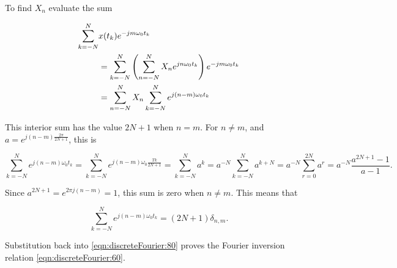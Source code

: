 To find \( X_n \) evaluate the sum

\begin{equation}\label{eqn:discreteFourier:80}
\begin{aligned}
\sum_{k = -N}^N &x(t_k) e^{-j m \omega_0 t_k} \\
&=
\sum_{k = -N}^N 
\lr{
\sum_{n = -N}^N X_n e^{ j n \omega_0 t_k}
}
e^{-j m \omega_0 t_k} \\
&=
\sum_{n = -N}^N X_n 
\sum_{k = -N}^N 
e^{ j (n -m )\omega_0 t_k}
\end{aligned}
\end{equation}

This interior sum has the value \( 2 N + 1 \) when \( n = m \).  For \( n \ne m \), and 
\( a = e^{j (n -m ) \frac{2 \pi}{2 N + 1}} \), this is

\begin{dmath}\label{eqn:discreteFourier:100}
\sum_{k = -N}^N 
e^{ j (n -m )\omega_0 t_k}
=
\sum_{k = -N}^N 
e^{ j (n -m )\omega_0 \frac{T k}{2 N + 1}}
=
\sum_{k = -N}^N a^k
=
a^{-N} \sum_{k = -N}^N a^{k+ N}
=
a^{-N} \sum_{r = 0}^{2 N} a^{r}
=
a^{-N} \frac{a^{2 N + 1} - 1}{a - 1}.
\end{dmath}

Since \( a^{2 N + 1} = e^{2 \pi j (n - m)} = 1 \), this sum is zero when \( n \ne m \).  This means that

\begin{equation}\label{eqn:discreteFourier:120}
\sum_{k = -N}^N 
e^{ j (n -m )\omega_0 t_k} = (2 N + 1) \delta_{n,m}.
\end{equation}

Substitution back into \cref{eqn:discreteFourier:80} proves the Fourier inversion relation \cref{eqn:discreteFourier:60}.

%
